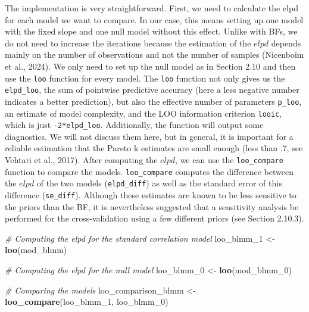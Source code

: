 \documentclass[
  doc,12pt,floatsintext]{apa7}
\newenvironment{Shaded}{\begin{snugshade}}{\end{snugshade}}
\newcommand{\CommentTok}[1]{\textcolor[rgb]{0.56,0.35,0.01}{\textit{#1}}}
\newcommand{\FunctionTok}[1]{\textcolor[rgb]{0.13,0.29,0.53}{\textbf{#1}}}
\newcommand{\NormalTok}[1]{#1}
\newcommand{\OtherTok}[1]{\textcolor[rgb]{0.56,0.35,0.01}{#1}}
\begin{document}
The implementation is very straightforward. First, we need to calculate the elpd for each model we want to compare. In our case, this means setting up one model with the fixed slope and one null model without this effect. Unlike with BFs, we do not need to increase the iterations because the estimation of the \(elpd\) depends mainly on the number of observations and not the number of samples (Nicenboim et al., 2024). We only need to set up the null model as in Section 2.10 and then use the \texttt{loo} function for every model. The \texttt{loo} function not only gives us the \texttt{elpd\_loo}, the sum of pointwise predictive accuracy (here a less negative number indicates a better prediction), but also the effective number of parameters \texttt{p\_loo}, an estimate of model complexity, and the LOO information criterion \texttt{looic}, which is just \texttt{-2*elpd\_loo}. Additionally, the function will output some diagnostics. We will not discuss them here, but in general, it is important for a reliable estimation that the Pareto k estimates are small enough (less than .7, see Vehtari et al., 2017). After computing the \(elpd\), we can use the \texttt{loo\_compare} function to compare the models. \texttt{loo\_compare} computes the difference between the \(elpd\) of the two models (\texttt{elpd\_diff}) as well as the standard error of this difference (\texttt{se\_diff}). Although these estimates are known to be less sensitive to the priors than the BF, it is nevertheless suggested that a sensitivity analysis be performed for the cross-validation using a few different priors (see Section 2.10.3).

\begin{Shaded}
\begin{Highlighting}[]
\CommentTok{\# Computing the elpd for the standard correlation model}
\NormalTok{loo\_blmm\_1 }\OtherTok{\textless{}{-}} \FunctionTok{loo}\NormalTok{(mod\_blmm)}

\CommentTok{\# Computing the elpd for the null model}
\NormalTok{loo\_blmm\_0 }\OtherTok{\textless{}{-}} \FunctionTok{loo}\NormalTok{(mod\_blmm\_0)}

\CommentTok{\# Comparing the models}
\NormalTok{loo\_comparison\_blmm }\OtherTok{\textless{}{-}} \FunctionTok{loo\_compare}\NormalTok{(loo\_blmm\_1, loo\_blmm\_0)}
\end{Highlighting}
\end{Shaded}
\end{document}
